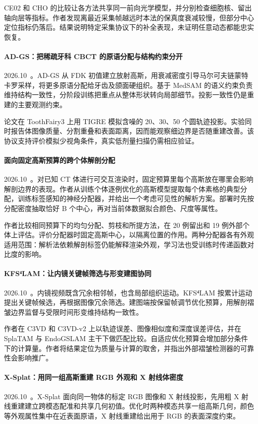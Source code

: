 CE02 和 CHO 的比较让各方法共享同一前向光学模型，并分别检查细胞核、留出轴向层等指标。作者发现离最近采集帧越远时本法的保真度衰减较慢，但部分中心定位指标仍落后。结果说明特定采集协议下的补全表现，未证明任意动态都能忠实恢复。

\paragraph{AD-GS：把稀疏牙科 CBCT 的原语分配与结构约束分开}
2026.10~\cite{2610_14963}。AD-GS 从 FDK 初值建立放射高斯，用衰减密度引导马尔可夫链蒙特卡罗采样，将更多原语分配给牙齿及颌面硬组织。基于 MedSAM 的语义约束负责维持结构一致性，分阶段训练把重点从整体形状转向局部细节。投影一致性仍是重建的主要观测约束。

论文在 ToothFairy3 上用 TIGRE 模拟含噪的 20、30、50 个圆轨迹投影。实验同时报告体图像质量、分割重叠和表面距离，因而能观察细边界是否随重建改善。该协议支持评价模拟少视角条件，真实低剂量扫描仍需相应验证。

\paragraph{面向固定高斯预算的跨个体解剖分配}
2026.10~\cite{2610_20397}。对已知 CT 体进行可交互渲染时，固定预算里每个高斯放在哪里会影响解剖边界的表现。作者从训练个体逐例优化的高斯模型提取每个体素格的典型分配，训练标签感知的神经分配器，并给出一个考虑可见性的解析方案。部署时先按分配密度抽取恰好 B 个中心，再对当前体数据拟合颜色、尺度等属性。

作者比较相同预算下的均匀分配、剪枝和所提方法，在 20 例留出和 19 例外部个体上评估。评价分配器时固定高斯中心，以隔离位置的作用。两种分配器各有外观适用范围：解析法依赖解剖标签仍能解释渲染外观，学习法也受训练时传递函数对比度的影响。

\paragraph{KFS⁴LAM：让内镜关键帧筛选与形变建图协同}
2026.10~\cite{2610_22505}。内镜视频既含冗余相邻帧，也含局部组织运动。KFS⁴LAM 按累计运动提出关键帧候选，再根据图像冗余筛选。建图端按保留帧调节优化预算，用解剖褶皱边界监督与受限时间形变维持结构一致性。

作者在 C3VD 和 C3VD-v2 上以轨迹误差、图像相似度和深度误差评估，并在 SplaTAM 与 EndoGSLAM 主干下做匹配比较。自适应优化预算会增加部分条件下的计算量。作者将结果定位为质量与计算的取舍，并指出外部褶皱检测器的可靠性会影响推广。

\paragraph{X-Splat：用同一组高斯重建 RGB 外观和 X 射线体密度}
2026.10~\cite{2610_23237}。X-Splat 面向同一物体的标定 RGB 图像和 X 射线投影，先用粗 X 射线重建建立跨模态配准和共享几何初值。优化时两种模态共享一组高斯几何，颜色等外观属性集中在近表面原语，X 射线重建给出用于 RGB 的表面深度约束。

